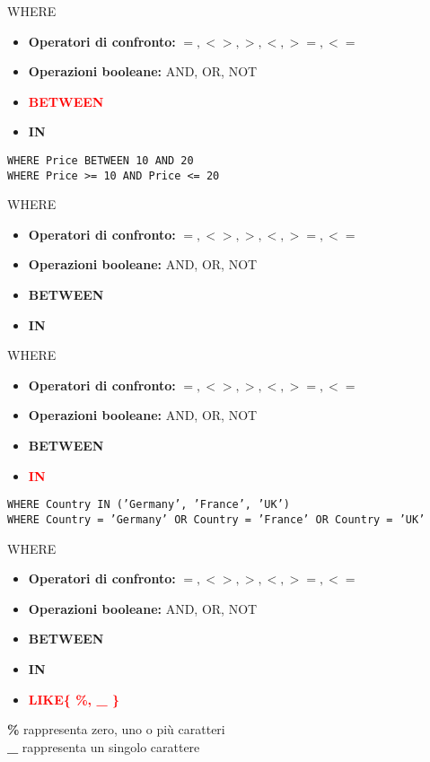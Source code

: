     \begin{frame}{WHERE}
    \begin{itemize}
        \item \textbf{Operatori di confronto:} $=, <>, >, <, >=, <=$
        \item \textbf{Operazioni booleane:} AND, OR, NOT
        \item \textbf{\textcolor{red}{BETWEEN}}
        \item \textbf{IN}
    \end{itemize}
    \vspace{2em}
    \texttt{WHERE Price BETWEEN 10 AND 20\\WHERE Price >= 10 AND Price <= 20}
    \end{frame}
    \begin{frame}{WHERE}
    \begin{itemize}
        \item \textbf{Operatori di confronto:} $=, <>, >, <, >=, <=$
        \item \textbf{Operazioni booleane:} AND, OR, NOT
        \item \textbf{BETWEEN}
        \item \textbf{IN}
    \end{itemize}
    \end{frame}
    \begin{frame}{WHERE}
    \begin{itemize}
        \item \textbf{Operatori di confronto:} $=, <>, >, <, >=, <=$
        \item \textbf{Operazioni booleane:} AND, OR, NOT
        \item \textbf{BETWEEN}
        \item \textbf{\textcolor{red}{IN}}
    \end{itemize}
    \vspace{2em}
    \texttt{WHERE Country IN ('Germany', 'France', 'UK')\\WHERE Country = 'Germany' OR Country = 'France' OR Country = 'UK'}
    \end{frame}
    \begin{frame}{WHERE}
    \begin{itemize}
        \item \textbf{Operatori di confronto:} $=, <>, >, <, >=, <=$
        \item \textbf{Operazioni booleane:} AND, OR, NOT
        \item \textbf{BETWEEN}
        \item \textbf{IN}
        \item \textbf{\textcolor{red}{LIKE\{ \%, \_ \}}}
    \end{itemize}
    \vspace{2em}
    \textbf{\%} rappresenta zero, uno o pi\`u caratteri\\
    \textbf{\_} rappresenta un singolo carattere\\
    \end{frame}
